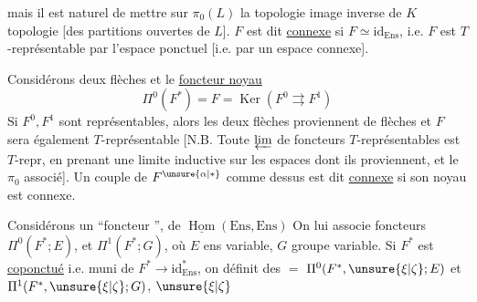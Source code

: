 mais il est naturel de mettre sur $\pi_0(L)$ la topologie image inverse de
$K$ topologie  [des partitions ouvertes de $L$].
$F$ est dit \uline{connexe} si $F\simeq\mathrm{id}_{\mathrm{Ens}}$,
i.e. $F$ est $T$-représentable par l'espace ponctuel
[i.e. par un espace connexe].

Considérons deux  flèches
et le \uline{foncteur noyau}
\[
\Pi^0(F^*)=F=\operatorname{Ker}(F^0\rightrightarrows F^1)
\]
Si $F^0,F^1$ sont représentables,
alors les deux flèches proviennent de flèches
et $F$ sera également $T$-représentable
[N.B. Toute $\varprojlim$ de foncteurs $T$-représentables est $T$-repr,
en prenant une limite inductive sur les espaces dont ils proviennent,
\deleted{\unsure{\xi}} et le $\pi_0$ associé].
Un couple de $F^{\unsure{\alpha|*}}$ comme dessus est dit
\uline{connexe} si son noyau est connexe.

Considérons un ``foncteur '',
de $\underline{\operatorname{Hom}}(\mathrm{Ens},\mathrm{Ens})$
On lui associe foncteurs $\Pi^0(F^*;E)$,
 et $\Pi^1(F^*;G)$,
où $E$ ens variable, $G$ groupe variable.
Si $F^*$ est \uline{coponctué} i.e. muni de
$F^*\to\mathrm{id}_{\mathrm{Ens}}^*$, on définit des $=$
$\Pi^0(F^*,\unsure{\xi|\zeta};E)$ et
$\Pi^1(F^*,\unsure{\xi|\zeta};G)$, $\unsure{\xi|\zeta}$
